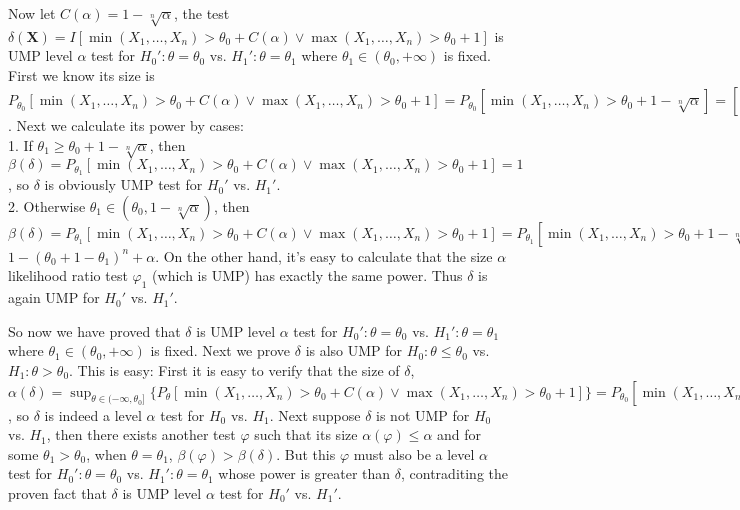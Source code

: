 Now let $C(\alpha)=1-\sqrt[n]{\alpha}$, the test
$
\delta(\mathbf{X}) =
I\left[
\min(X_1, \dots, X_n)>\theta_0+C(\alpha)
\vee
\max(X_1, \dots, X_n)>\theta_0+1
\right]
$
is UMP level $\alpha$ test for $H_0': \theta=\theta_0$ vs. $H_1': \theta=\theta_1$ where $\theta_1 \in (\theta_0, +\infty)$ is fixed.
First we know its size is
$
P_{\theta_0} \left[
\min(X_1, \dots, X_n)>\theta_0+C(\alpha)
\vee
\max(X_1, \dots, X_n)>\theta_0+1
\right] =
P_{\theta_0} \left[
\min(X_1, \dots, X_n)>\theta_0+1-\sqrt[n]{\alpha}
\right] =
\left[(\theta_0+1)-(\theta_0+1-\sqrt[n]{\alpha})\right]^n = \alpha
$.
Next we calculate its power by cases:\\
1. If $\theta_1 \geq \theta_0 + 1-\sqrt[n]{\alpha}$, then
$
\beta(\delta) =
P_{\theta_1} \left[
\min(X_1, \dots, X_n)>\theta_0+C(\alpha)
\vee
\max(X_1, \dots, X_n)>\theta_0+1
\right] = 1
$,
so $\delta$ is obviously UMP test for $H_0'$ vs. $H_1'$.
\\
2. Otherwise $\theta_1 \in (\theta_0, 1-\sqrt[n]{\alpha})$, then
$
\beta(\delta) =
P_{\theta_1} \left[
\min(X_1, \dots, X_n)>\theta_0+C(\alpha)
\vee
\max(X_1, \dots, X_n)>\theta_0+1
\right] =
P_{\theta_1} \left[
\min(X_1, \dots, X_n)>\theta_0+1-\sqrt[n]{\alpha}
\wedge
\max(X_1, \dots, X_n) \leq \theta_0+1
\right] +
P_{\theta_1} \left[
\max(X_1, \dots, X_n) > \theta_0+1
\right] =
$\\
$
1-(\theta_0+1-\theta_1)^{n} + \alpha
$. On the other hand, it's easy to calculate that the size $\alpha$ likelihood ratio test
$
\varphi_1
$
(which is UMP) has exactly the same power. Thus $\delta$ is again UMP for $H_0'$ vs. $H_1'$.

So now we have proved that $\delta$ is UMP level $\alpha$ test for $H_0': \theta=\theta_0$ vs. $H_1': \theta=\theta_1$ where $\theta_1 \in (\theta_0, +\infty)$ is fixed. Next we prove $\delta$ is also UMP for $H_0: \theta \leq \theta_0$ vs. $H_1: \theta > \theta_0$. This is easy:
First it is easy to verify that the size of $\delta$,
$\alpha(\delta) = \sup_{\theta \in (-\infty, \theta_0]} \{
P_{\theta} \left[
\min(X_1, \dots, X_n)>\theta_0+C(\alpha)
\vee
\max(X_1, \dots, X_n)>\theta_0+1
\right] \} =
P_{\theta_0} \left[
\min(X_1, \dots, X_n)>\theta_0+1-\sqrt[n]{\alpha}
\vee
\max(X_1, \dots, X_n)>\theta_0+1
\right] = \alpha
$,
so $\delta$ is indeed a level $\alpha$ test for $H_0$ vs. $H_1$.
Next suppose $\delta$ is not UMP for $H_0$ vs. $H_1$, then there exists another test $\varphi$ such that its size $\alpha(\varphi) \leq \alpha$ and for some $\theta_1 > \theta_0$, when $\theta=\theta_1$, $\beta(\varphi) > \beta(\delta)$. But this $\varphi$ must also be a level $\alpha$ test for $H_0': \theta=\theta_0$ vs. $H_1': \theta=\theta_1$ whose power is greater than $\delta$, contraditing the proven fact that $\delta$ is UMP level $\alpha$ test for $H_0'$ vs. $H_1'$.

